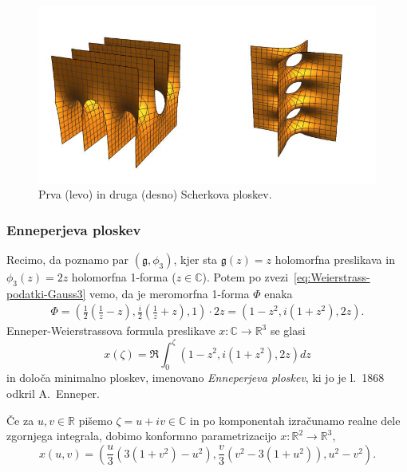 \documentclass[12pt,a4paper,twoside]{article}
\theoremstyle{definition} %
\theoremstyle{plain} %
\numberwithin{equation}{section}  %
\begin{document}
\begin{figure}[h!]
\begin{center}
\includegraphics[scale=1.18]{images/scherk.jpg}
\caption{Prva (levo) in druga (desno) Scherkova ploskev.}
\end{center}
\end{figure}

\subsubsection{Enneperjeva ploskev}
%
Recimo, da poznamo par $(\mathfrak{g}, \phi_3)$, kjer sta $\mathfrak{g}(z) = z$ holomorfna preslikava in $\phi_3(z) = 2z$ holomorfna 1-forma ($z \in \mathbb{C}$).
Potem po zvezi~\eqref{eq:Weierstrass-podatki-Gauss3} vemo, da je meromorfna 1-forma $\Phi$ enaka
\begin{gather*}
\Phi = \left( \frac{1}{2} \left( \frac{1}{z} - z \right), \frac{i}{2} \left( \frac{1}{z} + z \right), 1 \right) \cdot 2z = \left( 1-z^2, i(1+z^2), 2z \right).
\end{gather*}
Enneper-Weierstrassova formula preslikave $x \colon \mathbb{C} \to \mathbb{R}^3$ se glasi
\begin{equation}
x(\zeta) = \Re \int_{0}^{\zeta} \left( 1-z^2, i(1+z^2), 2z \right) dz
\end{equation}
in določa minimalno ploskev, imenovano \emph{Enneperjeva ploskev}, ki jo je l.~1868 odkril A.~Enneper.

Če za $ u,v \in \mathbb{R}$ pišemo $\zeta = u + iv \in \mathbb{C}$ in po komponentah izračunamo realne dele zgornjega integrala, dobimo konformno parametrizacijo $x \colon \mathbb{R}^2 \to \mathbb{R}^3$,
\begin{equation}
x(u,v) = \left( \frac{u}{3} \left(3(1+v^2) - u^2 \right), \frac{v}{3} \left( v^2 - 3(1+u^2) \right), u^2 - v^2 \right).
\end{equation}
\end{document}
